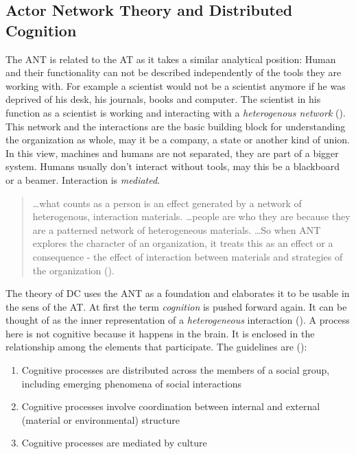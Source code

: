 \subsection{Actor Network Theory and Distributed Cognition}
The \ac{ANT} is related to the \acs{AT} as it takes a similar analytical position: Human and their functionality can not be described independently of the tools they are working with. For example a scientist would not be a scientist anymore if he was deprived of his desk, his journals, books and computer. The scientist in his function as a scientist is working and interacting with a \textit{heterogenous network} (\cite{law1992notes}). This network and the interactions are the basic building block for understanding the organization as whole, may it be a company, a state or another kind of union. In this view, machines and humans are not separated, they are part of a bigger system. Humans usually don't interact without tools, may this be a blackboard or a beamer. Interaction is  \textit{mediated}.
\begin{quotation}
  \dots what counts as a person is an effect generated by a network of heterogenous, interaction materials. \dots people are who they are because they are a patterned network of heterogeneous materials. \dots So when \acs{ANT} explores the character of an organization, it treats this as an effect or a consequence - the effect of interaction between materials and strategies of the organization (\cite{law1992notes}).
\end{quotation}

The theory of \ac{DC} uses the \acs{ANT} as a foundation and elaborates it to be usable in the sens of the \acs{AT}. At first the term \textit{cognition} is pushed forward again. It can be thought of as the inner representation of a \textit{heterogeneous} interaction (\cite{hutchins2000distributed}). A process here is not cognitive because it happens in the brain. It is enclosed in the relationship among the elements that participate. The guidelines are (\cite{hollan2000distributed}):
\begin{enumerate}
  \item Cognitive processes are distributed across the members of a social group, including emerging phenomena of social interactions
  \item Cognitive processes involve coordination between internal and external (material or environmental) structure
  \item Cognitive processes are mediated by culture
\end{enumerate}

